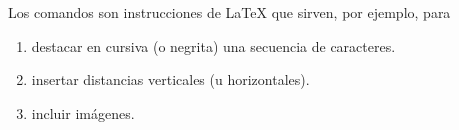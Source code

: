 \documentclass{article}
\begin{document}
Los comandos son instrucciones de \LaTeX{} que sirven, por ejemplo, para
\begin{enumerate} 
\item destacar en cursiva (o negrita) una secuencia de caracteres.
\item insertar distancias verticales (u horizontales).
\item incluir imágenes.
\end{enumerate}
\end{document}
